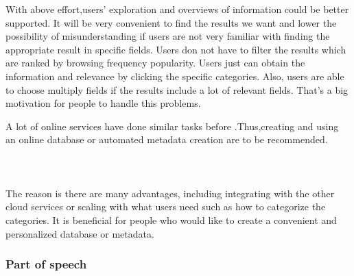 With above effort,users' exploration and overviews of information could be better supported. 
It will be very convenient to find the results we want and lower the possibility of misunderstanding if users are not very familiar with finding the appropriate result in specific fields.
\cite{TunThuraThet2010} Users don not have to filter the results which are ranked by browsing frequency popularity. 
Users just can obtain the information and relevance by clicking the specific categories. 
Also, users are able to choose multiply fields if the results include a lot of relevant fields. 
That's a big motivation for people to handle this problems. 

A lot of online services have done similar tasks before .Thus,creating and using an online database or automated metadata creation are to be recommended. \\\\\\\\ The reason is there are many advantages, including integrating with the other cloud services or scaling with what users need such as how to categorize the categories. It is beneficial for people who would like to create a convenient and personalized database or metadata.\\

\subsubsection*{Part of speech}

